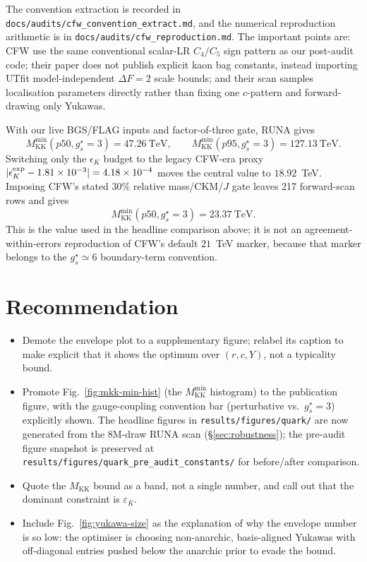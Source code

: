 \documentclass[11pt]{article}
\newcommand{\Mkk}{M_{\mathrm{KK}}}
\newcommand{\gs}{g_s^{\star}}
\newcommand{\eK}{\varepsilon_K}
\begin{document}
The convention extraction is recorded in
\texttt{docs/audits/cfw\_convention\_extract.md}, and the numerical
reproduction arithmetic is in
\texttt{docs/audits/cfw\_reproduction.md}.  The important points are:
CFW use the same conventional scalar-LR $C_4/C_5$ sign pattern as our
post-audit code; their paper does not publish explicit kaon bag constants,
instead importing UTfit model-independent $\Delta F=2$ scale bounds; and
their scan samples localisation parameters directly rather than fixing one
$c$-pattern and forward-drawing only Yukawas.

With our live BGS/FLAG inputs and factor-of-three gate, RUNA gives
\[
  \Mkk^{\min}(p50,\gs=3)=47.26~\mathrm{TeV},
  \qquad
  \Mkk^{\min}(p95,\gs=3)=127.13~\mathrm{TeV}.
\]
Switching only the $\epsilon_K$ budget to the legacy CFW-era proxy
$|\epsilon_K^{\rm exp}-1.81\times10^{-3}|=4.18\times10^{-4}$ moves the
central value to $18.92$~TeV.  Imposing CFW's stated 30\% relative
mass/CKM/$J$ gate leaves 217 forward-scan rows and gives
\[
  \Mkk^{\min}(p50,\gs=3)=23.37~\mathrm{TeV}.
\]
This is the value used in the headline comparison above; it is not an
agreement-within-errors reproduction of CFW's default $21$~TeV marker,
because that marker belongs to the $\gs\simeq6$ boundary-term convention.

\section{Recommendation}
\label{sec:recommendation}

\begin{itemize}[leftmargin=2em,itemsep=2pt]
  \item Demote the envelope plot to a supplementary figure; relabel its
        caption to make explicit that it shows the optimum over
        $(r,c,Y)$, not a typicality bound.
  \item Promote Fig.~\ref{fig:mkk-min-hist} (the $\Mkk^{\min}$ histogram)
        to the publication figure, with the gauge-coupling convention bar
        (perturbative vs.\ $\gs = 3$) explicitly shown. The headline
        figures in \texttt{results/figures/quark/} are now generated from
        the 8M-draw RUNA scan
        (\S\ref{sec:robustness}); the pre-audit figure snapshot is
        preserved at
        \texttt{results/figures/quark\_pre\_audit\_constants/} for
        before/after comparison.
  \item Quote the $\Mkk$ bound as a band, not a single number, and call
        out that the dominant constraint is $\eK$.
  \item Include Fig.~\ref{fig:yukawa-size} as the explanation of why the
        envelope number is so low: the optimiser is choosing
        non-anarchic, basis-aligned Yukawas with off-diagonal entries
        pushed below the anarchic prior to evade the bound.
\end{itemize}
\end{document}
